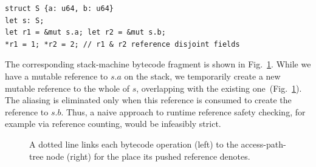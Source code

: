 \noindent\hfil\begin{minipage}{0.78\linewidth}
\begin{lstlisting}[language=Move,style=MoveStyle,basicstyle=\relsize{-2}\ttfamily,keywordstyle=\color{blue},frame=single,frameround=tttt,framesep=4pt,rulecolor=\color{gray!60},backgroundcolor=\color{gray!4}]
struct S {a: u64, b: u64}
let s: S;
let r1 = &mut s.a; let r2 = &mut s.b;
*r1 = 1; *r2 = 2; // r1 & r2 reference disjoint fields
\end{lstlisting}
\end{minipage}\hfil

\noindent The corresponding stack-machine bytecode fragment is shown in Fig.~\ref{fig:aliastree}.
\noindent While we have a mutable reference to $s.a$ on the stack, we temporarily create a new mutable reference to the whole of $s$, overlapping with the existing one~(Fig.~\ref{fig:aliastree}).
The aliasing is eliminated only when this reference is consumed to create the reference to $s.b$.
Thus, a naive approach to runtime reference safety checking, for example via reference counting, would be infeasibly strict.

\begin{figure}[t]
\centering
{}
\caption{A dotted line links each bytecode operation (left) to the access-path-tree node (right) for the place its pushed reference denotes.
}
\label{fig:aliastree}
\end{figure}

